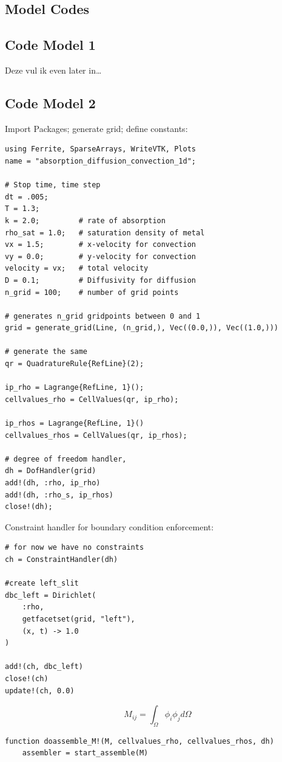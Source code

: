 \begin{appendices}
\renewcommand{\theequation}{A\arabic{equation}}
\section{Model Codes}

\subsection{Code Model 1}
Deze vul ik even later in\dots

\subsection{Code Model 2}
    
Import Packages; generate grid; define constants:
\begin{lstlisting}
using Ferrite, SparseArrays, WriteVTK, Plots
name = "absorption_diffusion_convection_1d";

# Stop time, time step
dt = .005;
T = 1.3;
k = 2.0;         # rate of absorption
rho_sat = 1.0;   # saturation density of metal
vx = 1.5;        # x-velocity for convection
vy = 0.0;        # y-velocity for convection
velocity = vx;   # total velocity 
D = 0.1;         # Diffusivity for diffusion
n_grid = 100;    # number of grid points

# generates n_grid gridpoints between 0 and 1
grid = generate_grid(Line, (n_grid,), Vec((0.0,)), Vec((1.0,)))

# generate the same 
qr = QuadratureRule{RefLine}(2);

ip_rho = Lagrange{RefLine, 1}();
cellvalues_rho = CellValues(qr, ip_rho);

ip_rhos = Lagrange{RefLine, 1}()
cellvalues_rhos = CellValues(qr, ip_rhos);

# degree of freedom handler, 
dh = DofHandler(grid)
add!(dh, :rho, ip_rho)
add!(dh, :rho_s, ip_rhos)
close!(dh);
\end{lstlisting}
Constraint handler for boundary condition enforcement:
\begin{lstlisting}
# for now we have no constraints
ch = ConstraintHandler(dh)

#create left_slit
dbc_left = Dirichlet(
    :rho,
    getfacetset(grid, "left"),
    (x, t) -> 1.0
)

add!(ch, dbc_left)
close!(ch)
update!(ch, 0.0)
\end{lstlisting}
\begin{equation}
    M_{ij} = \int_{\Omega} \phi_i \phi_j d\Omega
\end{equation}
\begin{lstlisting}
function doassemble_M!(M, cellvalues_rho, cellvalues_rhos, dh)
    assembler = start_assemble(M)


\end{lstlisting}
\end{appendices}
